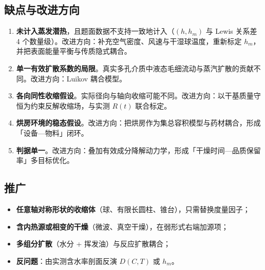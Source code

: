 \subsection{缺点与改进方向}


\begin{enumerate}
\item \textbf{未计入蒸发潜热}，且题面数据不支持一致地计入（$(h,h_m)$ 与 Lewis 关系差 4 个数量级）。改进方向：补充空气密度、风速与干湿球温度，重新标定 $h_m$，并把表面能量平衡与传质隐式耦合。
\item \textbf{单一有效扩散系数的局限}。真实多孔介质中液态毛细流动与蒸汽扩散的贡献不同。改进方向：Luikov 耦合模型。
\item \textbf{各向同性收缩假设}。实际径向与轴向收缩可能不同。改进方向：以干基质量守恒为约束反解收缩场，与实测 $R(t)$ 联合标定。
\item \textbf{烘房环境的稳态假设}。改进方向：把烘房作为集总容积模型与药材耦合，形成「设备—物料」闭环。
\item \textbf{判据单一}。改进方向：叠加有效成分降解动力学，形成「干燥时间—品质保留率」多目标优化。
\end{enumerate}


\subsection{推广}


\begin{itemize}
\item \textbf{任意轴对称形状的收缩体}（球、有限长圆柱、锥台），只需替换度量因子；
\item \textbf{含内热源或相变的干燥}（微波、真空干燥），在弱形式右端加源项；
\item \textbf{多组分扩散}（水分 + 挥发油）与反应扩散耦合；
\item \textbf{反问题}：由实测含水率剖面反演 $D(C,T)$ 或 $h_m$。
\end{itemize}

